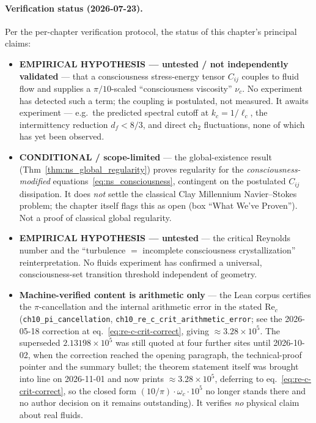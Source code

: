 \paragraph{Verification status (2026-07-23).}
Per the per-chapter verification protocol, the status of this chapter's principal claims:
\begin{itemize}
\item \textbf{EMPIRICAL HYPOTHESIS --- untested / not independently validated} ---
  that a consciousness stress-energy tensor $C_{ij}$ couples to fluid flow and
  supplies a $\pi/10$-scaled ``consciousness viscosity'' $\nu_c$. No experiment has
  detected such a term; the coupling is postulated, not measured. It awaits
  experiment --- e.g.\ the predicted spectral cutoff at $k_c=1/\ell_c$, the
  intermittency reduction $d_f<8/3$, and direct $\text{ch}_2$ fluctuations, none of
  which has yet been observed.
\item \textbf{CONDITIONAL / scope-limited} --- the global-existence result
  (Thm~\ref{thm:ns_global_regularity}) proves regularity for the
  \emph{consciousness-modified} equations~\eqref{eq:ns_consciousness}, contingent on
  the postulated $C_{ij}$ dissipation. It does \emph{not} settle the classical Clay
  Millennium Navier--Stokes problem; the chapter itself flags this as open (box
  ``What We've Proven''). Not a proof of classical global regularity.
\item \textbf{EMPIRICAL HYPOTHESIS --- untested} --- the critical Reynolds number and
  the ``turbulence $=$ incomplete consciousness crystallization'' reinterpretation.
  No fluids experiment has confirmed a universal, consciousness-set transition
  threshold independent of geometry.
\item \textbf{Machine-verified content is arithmetic only} --- the Lean corpus
  certifies the $\pi$-cancellation and the internal arithmetic error in the stated
  $\text{Re}_c$ (\texttt{ch10\_pi\_cancellation},
  \texttt{ch10\_re\_c\_crit\_arithmetic\_error}; see the 2026-05-18 correction at
  eq.~\eqref{eq:re-c-crit-correct}, giving $\approx 3.28\times10^5$. The
  superseded $2.13198\times10^5$ was still quoted at four further sites until
  2026-10-02, when the correction reached the opening paragraph, the
  technical-proof pointer and the summary bullet; the theorem statement itself
  was brought into line on 2026-11-01 and now prints $\approx 3.28\times10^5$,
  deferring to eq.~\eqref{eq:re-c-crit-correct}, so the closed form
  $(10/\pi)\cdot\omega_c\cdot10^5$ no longer stands there and no author decision
  on it remains outstanding). It verifies \emph{no}
  physical claim about real fluids.
\end{itemize}

